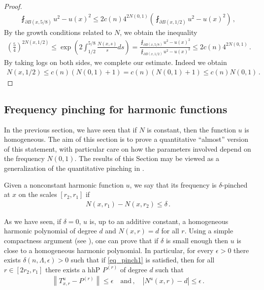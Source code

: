 \documentclass[11pt]{article}
\begin{document}
\begin{proof}
\begin{gather}
\fint_{\partial B(x,5/8)} u^2-u(x)^2 \leq 2c(n) 4^{2N(0,1)} {\left({\fint_{\partial B(x,1/2)} u^2 - u(x)^2}\right)}\, ,
\end{gather}
By the growth conditions related to $ N$, we obtain the inequality
\begin{gather}
 {\left({\frac 5 4}\right)}^{2 N(x,1/2)}\leq \exp{\left({2\int_{1/2}^{5/8} \frac{ N(x,s)} s ds}\right)} = \frac{\fint_{\partial B(x,5/8)} u^2-u(x)^2 }{\fint_{\partial B(x,1/2)} u^2 - u(x)^2} \leq 2c(n) 4^{2N(0,1)}\, .
\end{gather}
By taking logs on both sides, we complete our estimate. Indeed we obtain
\begin{gather}
  N(x,1/2)\leq c(n) (N(0,1) +1) = c(n) ( N(0,1) +1) \leq c(n)  N(0,1)\, .
\end{gather}

\end{proof}

\subsection{Frequency pinching for harmonic functions}\label{ss:hpinch}
In the previous section, we have seen that if $N$ is constant, then the function $u$ is homogeneous. The aim of this section is to prove a quantitative ``almost'' version of this statement, with particular care on how the parameters involved depend on the frequency $N(0,1)$.  The results of this Section may be viewed as a generalization of the quantitative pinching in \cite[theorem 2.8]{chnava}.

\begin{definition}
Given a nonconstant harmonic function $u$, we say that its frequency is $\delta$-pinched at $x$ on the scales $[r_2,r_1]$ if
\begin{gather}\label{eq_pinch1}
N(x,r_1)- N(x,r_2)\leq \delta\, .
\end{gather}
\end{definition}
As we have seen, if $\delta=0$, $u$ is, up to an additive constant, a homogeneous harmonic polynomial of degree $d$ and $N(x,r)=d$ for all $r$. Using a simple compactness argument (see \cite[theorem 2.8]{chnava}), one can prove that if $\delta$ is small enough then $u$ is close to a homogeneous harmonic polynomial. In particular, for every $\epsilon>0$ there exists $\delta(n,\Lambda,\epsilon)>0$ such that if \eqref{eq_pinch1} is satisfied, then for all $r\in [2r_2,r_1]$ there exists a hhP $P^{(r)}$ of degree $d$ such that
\begin{gather}
{\left\|{T^u_{x,r}-P^{(r)}}\right\|}\leq \epsilon\quad \text{and}\, , \quad {\left|{N^u(x,r)-d}\right|}\leq \epsilon\, .
\end{gather}
\end{document}
